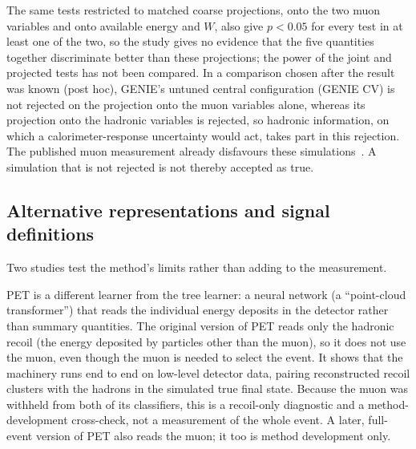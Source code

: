 The same tests restricted to matched coarse projections, onto the two muon variables and onto available energy and $W$, also give $p<0.05$ for every test in at least one of the two, so the study gives no evidence that the five quantities together discriminate better than these projections; the power of the joint and projected tests has not been compared. In a comparison chosen after the result was known (post hoc), GENIE's untuned central configuration (GENIE CV) is not rejected on the projection onto the muon variables alone, whereas its projection onto the hadronic variables is rejected, so hadronic information, on which a calorimeter-response uncertainty would act, takes part in this rejection. The published muon measurement already disfavours these simulations~\cite{MINERvA:2021owq}. A simulation that is not rejected is not thereby accepted as true.

\subsection*{Alternative representations and signal definitions}

Two studies test the method's limits rather than adding to the measurement.

PET is a different learner from the tree learner: a neural network (a ``point-cloud transformer'') that reads the individual energy deposits in the detector rather than summary quantities. The original version of PET reads only the hadronic recoil (the energy deposited by particles other than the muon), so it does not use the muon, even though the muon is needed to select the event. It shows that the machinery runs end to end on low-level detector data, pairing reconstructed recoil clusters with the hadrons in the simulated true final state. Because the muon was withheld from both of its classifiers, this is a recoil-only diagnostic and a method-development cross-check, not a measurement of the whole event. A later, full-event version of PET also reads the muon; it too is method development only.

